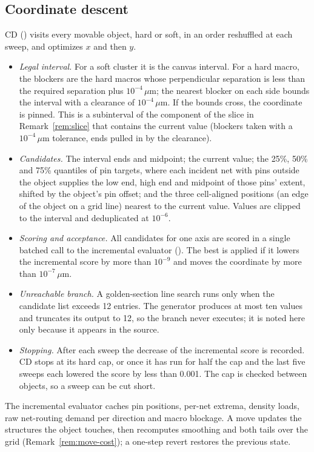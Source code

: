 \subsection{Coordinate descent}\label{app:alg-cd}

CD () visits every movable object, hard or soft, in an
order reshuffled at each sweep, and optimizes $x$ and then $y$.
\begin{itemize}
  \item \emph{Legal interval.} For a soft cluster it is the canvas interval. For a
        hard macro, the blockers are the hard macros whose perpendicular separation
        is less than the required separation plus $10^{-4}\,\mu$m; the nearest
        blocker on each side bounds the interval with a clearance of
        $10^{-4}\,\mu$m. If the bounds cross, the coordinate is pinned. This is a
        subinterval of the component of the slice in Remark~\ref{rem:slice} that
        contains the current value (blockers taken with a $10^{-4}\,\mu$m tolerance,
        ends pulled in by the clearance).
  \item \emph{Candidates.} The interval ends and midpoint; the current value; the
        25\%, 50\% and 75\% quantiles of pin targets, where each incident net with
        pins outside the object supplies the low end, high end and midpoint of those
        pins' extent, shifted by the object's pin offset; and the three cell-aligned
        positions (an edge of the object on a grid line) nearest to the current
        value. Values are clipped to the interval and deduplicated at $10^{-6}$.
  \item \emph{Scoring and acceptance.} All candidates for one axis are scored in a
        single batched call to the incremental evaluator
        (). The best is applied if it lowers the
        incremental score by more than $10^{-9}$ and moves the coordinate by more
        than $10^{-7}\,\mu$m.
  \item \emph{Unreachable branch.} A golden-section line search runs only when the
        candidate list exceeds 12 entries. The generator produces at most ten values
        and truncates its output to 12, so the branch never executes; it is noted
        here only because it appears in the source.
  \item \emph{Stopping.} After each sweep the decrease of the incremental score is
        recorded. CD stops at its hard cap, or once it has run for half the cap and
        the last five sweeps each lowered the score by less than 0.001. The cap is
        checked between objects, so a sweep can be cut short.
\end{itemize}
The incremental evaluator caches pin positions, per-net extrema, density loads, raw
net-routing demand per direction and macro blockage. A move updates the structures
the object touches, then recomputes smoothing and both tails over the grid
(Remark~\ref{rem:move-cost}); a one-step revert restores the previous state.

